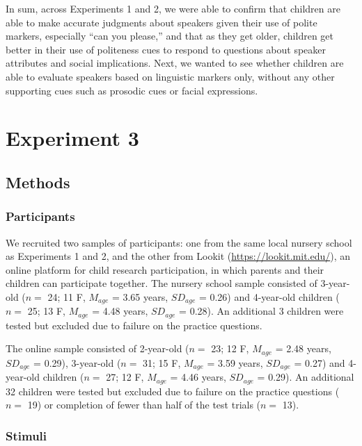 \documentclass[10pt, letterpaper]{article}
\begin{document}
In sum, across Experiments 1 and 2, we were able to confirm that
children are able to make accurate judgments about speakers given their
use of polite markers, especially ``can you please,'' and that as they
get older, children get better in their use of politeness cues to
respond to questions about speaker attributes and social implications.
Next, we wanted to see whether children are able to evaluate speakers
based on linguistic markers only, without any other supporting cues such
as prosodic cues or facial expressions.

\section{Experiment 3}\label{experiment-3}

\subsection{Methods}\label{methods-2}

\subsubsection{Participants}\label{participants-2}

We recruited two samples of participants: one from the same local
nursery school as Experiments 1 and 2, and the other from Lookit
(\url{https://lookit.mit.edu/}), an online platform for child research
participation, in which parents and their children can participate
together. The nursery school sample consisted of 3-year-old (\(n=\) 24;
11 F, \(M_{age}\) = 3.65 years, \(SD_{age}\) = 0.26) and 4-year-old
children (\(n=\) 25; 13 F, \(M_{age}\) = 4.48 years, \(SD_{age}\) =
0.28). An additional 3 children were tested but excluded due to failure
on the practice questions.

The online sample consisted of 2-year-old (\(n=\) 23; 12 F, \(M_{age}\)
= 2.48 years, \(SD_{age}\) = 0.29), 3-year-old (\(n=\) 31; 15 F,
\(M_{age}\) = 3.59 years, \(SD_{age}\) = 0.27) and 4-year-old children
(\(n=\) 27; 12 F, \(M_{age}\) = 4.46 years, \(SD_{age}\) = 0.29). An
additional 32 children were tested but excluded due to failure on the
practice questions (\(n=\) 19) or completion of fewer than half of the
test trials (\(n=\) 13).

\subsubsection{Stimuli}\label{stimuli}
\end{document}
